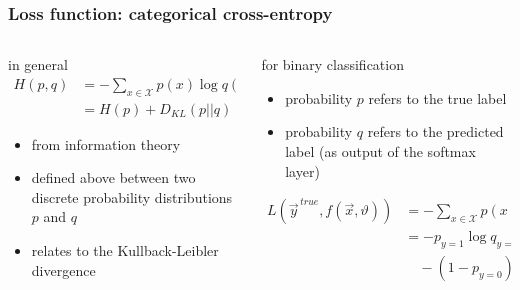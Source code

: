 \documentclass[
  aspectratio=1610, %
  intlimits %
]{beamer}
\begin{document}
\begin{frame}
 \frametitle{Loss function: categorical cross-entropy}

 \begin{columns}
 \begin{column}{.49\textwidth}
 \begin{exampleblock}{in general}
   \begin{align*}
     H(p, q) &= - \sum_{x \in \mathcal{X}} p(x) \log q(x)\\
             &= H(p) + D_{KL}(p || q)
 \end{align*}
   \begin{itemize}
   \item from information theory
   \item defined above between two discrete probability distributions $p$ and $q$
   \item relates to the Kullback-Leibler divergence
   \end{itemize}
 \end{exampleblock}
\end{column}

 \begin{column}{.49\textwidth}
 \begin{exampleblock}{for binary classification}
   \begin{itemize}
   \item probability $p$ refers to the true label
   \item probability $q$ refers to the predicted label (as output of the softmax layer)
 \end{itemize}
 
   \begin{align*}
 L( \vec{y}^{\,true}, f(\vec{x}, \vartheta)) &= - \sum_{x \in \mathcal{X}} p(x) \log q(x) \\
                                             &= - p_{y=1} \log q_{\hat{y}=1} \\
                                               &\quad - (1-p_{y=0}) \log (1-q_{\hat{y}=0})
   \end{align*}
   
\end{exampleblock}

\end{column}
\end{columns}


\end{frame}
\end{document}
